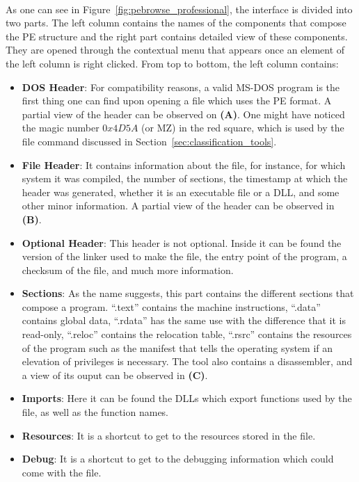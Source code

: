 \paragraph{}
As one can see in Figure~\ref{fig:pebrowse_professional}, the interface is divided into two parts. The left column contains the names of the components that compose the PE structure and the right part contains detailed view of these components. They are opened through the contextual menu that appears once an element of the left column is right clicked. From top to bottom, the left column contains:
\begin{itemize}
	\item \textbf{DOS Header}: For compatibility reasons, a valid MS-DOS program is the first thing one can find upon opening a file which uses the PE format. A partial view of the header can be observed on \textbf{(A)}. One might have noticed the magic number $0x4D5A$ (or MZ) in the red square, which is used by the file command discussed in Section~\ref{sec:classification_tools}.
	\item \textbf{File Header}: It contains information about the file, for instance, for  which system it was compiled, the number of sections, the timestamp at which the header was generated, whether it is an executable file or a DLL, and some other minor information. A partial view of the header can be observed in \textbf{(B)}.
	\item \textbf{Optional Header}: This header is not optional. Inside it can be found the version of the linker used to make the file, the entry point of the program, a checksum of the file, and much more information.
	\item \textbf{Sections}: As the name suggests, this part contains the different sections that compose a program. “.text” contains the machine instructions, “.data” contains global data, “.rdata” has the same use with the difference that it is read-only, “.reloc” contains the relocation table, “.rsrc” contains the resources of the program such as the manifest that tells the operating system if an elevation of privileges is necessary. The tool also contains a disassembler, and a view of its ouput can be observed in \textbf{(C)}.
	\item \textbf{Imports}: Here it can be found the DLLs which export functions used by the file, as well as the function names.
	\item \textbf{Resources}: It is a shortcut to get to the resources stored in the file.
	\item \textbf{Debug}: It is a shortcut to get to the debugging information which could come with the file.
\end{itemize}

